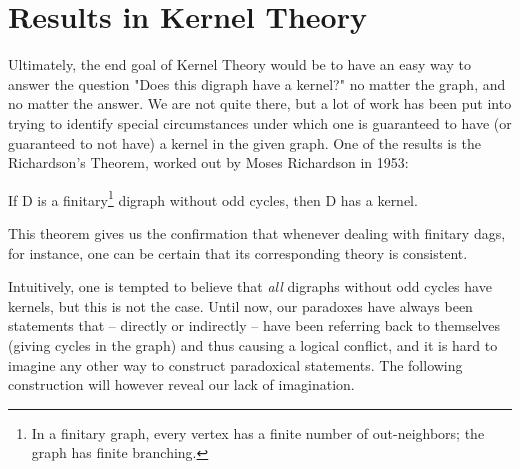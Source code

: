 \section{Results in Kernel Theory}
\label{sec:Results in Kernel Theory}
Ultimately, the end goal of Kernel Theory would be to have an easy way to answer the question "Does this digraph have a kernel?" no matter the graph, and no matter the answer.
We are not quite there, but a lot of work has been put into trying to identify special circumstances under which one is guaranteed to have (or guaranteed to not have) a kernel in the given graph.
One of the results is the Richardson's Theorem, worked out by Moses Richardson in 1953:\\

\begin{theorem}
  \cite{am-richardson} If D is a finitary\footnote{In a finitary graph, every vertex has a finite number of out-neighbors; the graph has finite branching.} digraph without odd cycles, then D has a kernel.
\end{theorem}
This theorem gives us the confirmation that whenever dealing with finitary dags, for instance, one can be certain that its corresponding theory is consistent.

Intuitively, one is tempted to believe that \textit{all} digraphs without odd cycles have kernels, but this is not the case.
Until now, our paradoxes have always been statements that -- directly or indirectly -- have been referring back to themselves (giving cycles in the graph) and thus causing a logical conflict, and it is hard to imagine any other way to construct paradoxical statements.
The following construction will however reveal our lack of imagination.

